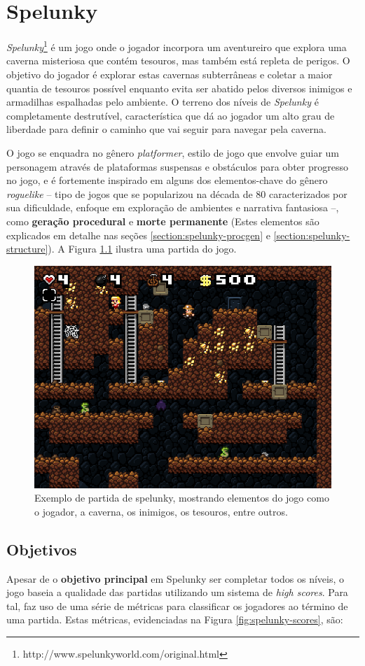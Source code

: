 \chapter{\label{chap:spelunky}Spelunky}
\textit{Spelunky}\footnote{http://www.spelunkyworld.com/original.html} é um jogo
onde o jogador incorpora um aventureiro que explora uma caverna misteriosa que
contém tesouros, mas também está repleta de perigos. O objetivo do jogador é
explorar estas cavernas subterrâneas e coletar a maior quantia de tesouros
possível enquanto evita ser abatido pelos diversos inimigos e armadilhas
espalhadas pelo ambiente. O terreno dos níveis de \textit{Spelunky} é
completamente destrutível, característica que dá ao jogador um alto grau de
liberdade para definir o caminho que vai seguir para navegar pela caverna.

O jogo se enquadra no gênero \textit{platformer}, estilo de jogo que envolve
guiar um personagem através de plataformas suspensas e obstáculos para obter
progresso no jogo, e é fortemente inspirado em alguns dos elementos-chave do
gênero \textit{roguelike} -- tipo de jogos que se popularizou na década de 80
caracterizados por sua dificuldade, enfoque em exploração de ambientes e
narrativa fantasiosa --, como \textbf{geração procedural} e \textbf{morte
permanente} (Estes elementos são explicados em detalhe nas seções
\ref{section:spelunky-procgen} e \ref{section:spelunky-structure}). A Figura
\ref{fig:spelunky-gameplay} ilustra uma partida do jogo.

\begin{figure}[htb!]
\centering
\includegraphics[width=.65\textwidth]{fig/spelunky-pc-screen.png}
\caption{\label{fig:spelunky-gameplay}Exemplo de partida de spelunky, mostrando
elementos do jogo como o jogador, a caverna, os inimigos, os tesouros, entre
outros.}
\end{figure}


\section{\label{section:spelunky-goals}Objetivos}
Apesar de o \textbf{objetivo principal} em Spelunky ser completar todos os
níveis, o jogo baseia a qualidade das partidas utilizando um sistema de
\textit{high scores}. Para tal, faz uso de uma série de métricas para
classificar os jogadores ao término de uma partida. Estas métricas, evidenciadas
na Figura \ref{fig:spelunky-scores}, são:

